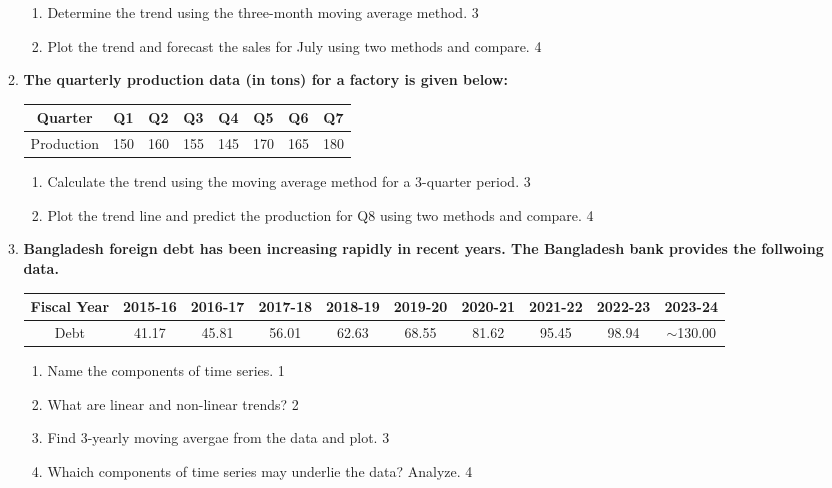 \documentclass[a4paper,oneside]{book}
\begin{document}
\begin{enumerate}
\begin{enumerate}
\begin{enumerate}
\item
Determine the trend using the three-month moving average method. \hfill 3
\item
Plot the trend and forecast the sales for July using two methods 
and compare. \hfill 4
\end{enumerate}

\item
\textbf{The quarterly production data (in tons) for a factory is given below:}

\begin{table}[h]
\centering
\begin{tabular}{cccccccc}
Quarter    & Q1     & Q2     & Q3     & Q4     & Q5     & Q6     & Q7     \\ \hline
Production & 150    & 160    & 155    & 145    & 170    & 165    & 180    \\
\end{tabular}
\end{table}

\begin{enumerate}
\item
Calculate the trend using the moving average method for a 3-quarter period. \hfill 3
\item
Plot the trend line and predict the production for Q8 using two methods 
and compare. \hfill 4
\end{enumerate}


  
     \item
	  \textbf{Bangladesh foreign debt has been increasing rapidly in recent years. The Bangladesh bank provides the follwoing data.}
	  
	  \begin{table}[h]
	  \centering
\begin{tabular}{c|c|c|c|c|c|c|c|c|c}
Fiscal Year & 2015-16 & 2016-17 & 2017-18 & 2018-19 & 2019-20 & 2020-21 & 2021-22 & 2022-23 & 2023-24 \\ \hline
Debt & 41.17 & 45.81 & 56.01 & 62.63 & 68.55 & 81.62 & 95.45 & 98.94 & $\sim$130.00
\end{tabular}
\end{table}
  
  \begin{enumerate}
    \item
	Name the components of time series. \hfill 1
    \item
	What are linear and non-linear trends? \hfill 2
    \item  
	Find 3-yearly moving avergae from the data and plot. \hfill 3
    \item
	Whaich components of time series may underlie the data? Analyze. \hfill 4
  \end{enumerate}


\end{enumerate}
\end{enumerate}
\end{document}
